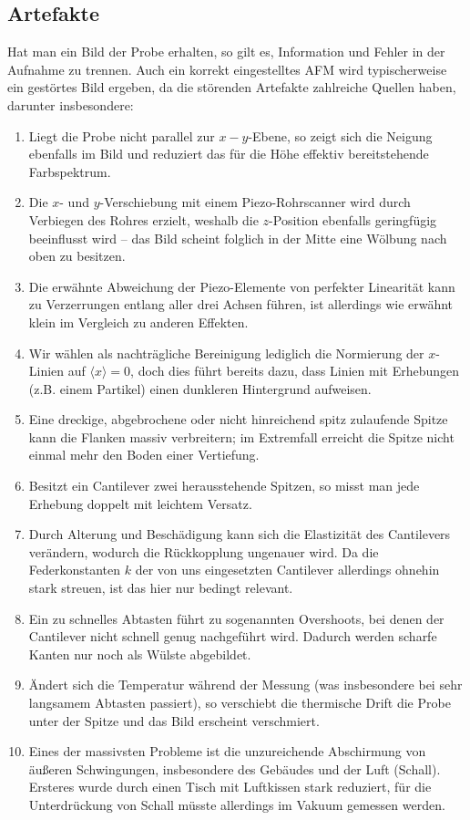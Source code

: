 \subsection{Artefakte}
Hat man ein Bild der Probe erhalten, so gilt es, Information und Fehler in der Aufnahme zu trennen. Auch ein korrekt eingestelltes AFM wird typischerweise ein gestörtes Bild ergeben, da die störenden Artefakte zahlreiche Quellen haben, darunter insbesondere:
\begin{enumerate}
\item Liegt die Probe nicht parallel zur $x-y$-Ebene, so zeigt sich die Neigung ebenfalls im Bild und reduziert das für die Höhe effektiv bereitstehende Farbspektrum.
\item Die $x$- und $y$-Verschiebung mit einem Piezo-Rohrscanner wird durch Verbiegen des Rohres erzielt, weshalb die $z$-Position ebenfalls geringfügig beeinflusst wird -- das Bild scheint folglich in der Mitte eine Wölbung nach oben zu besitzen. 
\item Die erwähnte Abweichung der Piezo-Elemente von perfekter Linearität kann zu Verzerrungen entlang aller drei Achsen führen, ist allerdings wie erwähnt klein im Vergleich zu anderen Effekten.
\item Wir wählen als nachträgliche Bereinigung lediglich die Normierung der $x$-Linien auf $\langle x\rangle = 0$, doch dies führt bereits dazu, dass Linien mit Erhebungen (z.B. einem Partikel) einen dunkleren Hintergrund aufweisen. 
\item Eine dreckige, abgebrochene oder nicht hinreichend spitz zulaufende Spitze kann die Flanken massiv verbreitern; im Extremfall erreicht die Spitze nicht einmal mehr den Boden einer Vertiefung.
\item Besitzt ein Cantilever zwei herausstehende Spitzen, so misst man jede Erhebung doppelt mit leichtem Versatz.
\item Durch Alterung und Beschädigung kann sich die Elastizität des Cantilevers verändern, wodurch die Rückkopplung ungenauer wird. Da die Federkonstanten $k$ der von uns eingesetzten Cantilever allerdings ohnehin stark streuen, ist das hier nur bedingt relevant.
\item Ein zu schnelles Abtasten führt zu sogenannten Overshoots, bei denen der Cantilever nicht schnell genug nachgeführt wird. Dadurch werden scharfe Kanten nur noch als Wülste abgebildet.
\item Ändert sich die Temperatur während der Messung (was insbesondere bei sehr langsamem Abtasten passiert), so verschiebt die thermische Drift die Probe unter der Spitze und das Bild erscheint verschmiert.
\item Eines der massivsten Probleme ist die unzureichende Abschirmung von äußeren Schwingungen, insbesondere des Gebäudes und der Luft (Schall). Ersteres wurde durch einen Tisch mit Luftkissen stark reduziert, für die Unterdrückung von Schall müsste allerdings im Vakuum gemessen werden. 
\end{enumerate}